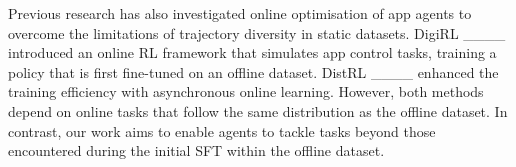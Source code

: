 Previous research has also investigated online optimisation of app agents to overcome the limitations of trajectory diversity in static datasets. DigiRL ____ introduced an online RL framework that simulates app control tasks, training a policy that is first fine-tuned on an offline dataset. DistRL ____ enhanced the training efficiency with asynchronous online learning. However, both methods depend on online tasks that follow the same distribution as the offline dataset. In contrast, our work aims to enable agents to tackle tasks beyond those encountered during the initial SFT within the offline dataset.